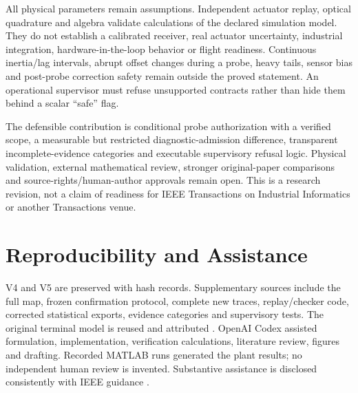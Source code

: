 \documentclass[10pt,journal]{IEEEtran}
\begin{document}
All physical parameters remain assumptions. Independent actuator replay, optical quadrature and algebra validate calculations of the declared simulation model. They do not establish a calibrated receiver, real actuator uncertainty, industrial integration, hardware-in-the-loop behavior or flight readiness. Continuous inertia/lag intervals, abrupt offset changes during a probe, heavy tails, sensor bias and post-probe correction safety remain outside the proved statement. An operational supervisor must refuse unsupported contracts rather than hide them behind a scalar ``safe'' flag.

The defensible contribution is conditional probe authorization with a verified scope, a measurable but restricted diagnostic-admission difference, transparent incomplete-evidence categories and executable supervisory refusal logic. Physical validation, external mathematical review, stronger original-paper comparisons and source-rights/human-author approvals remain open. This is a research revision, not a claim of readiness for IEEE Transactions on Industrial Informatics or another Transactions venue.

\section*{Reproducibility and Assistance}
V4 and V5 are preserved with hash records. Supplementary sources include the full map, frozen confirmation protocol, complete new traces, replay/checker code, corrected statistical exports, evidence categories and supervisory tests. The original terminal model is reused and attributed \cite{source}. OpenAI Codex assisted formulation, implementation, verification calculations, literature review, figures and drafting. Recorded MATLAB runs generated the plant results; no independent human review is invented. Substantive assistance is disclosed consistently with IEEE guidance \cite{aipolicy}.

\end{document}
